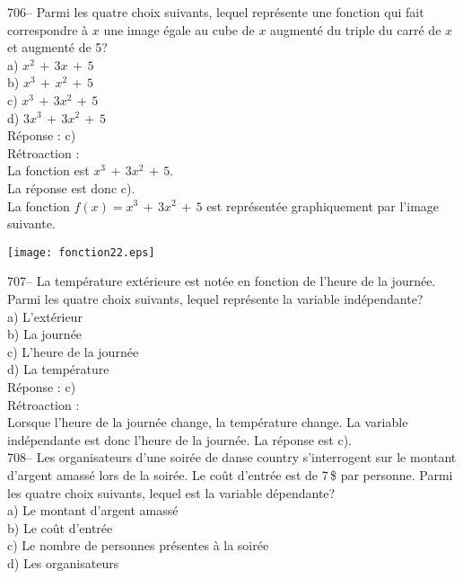 ﻿\documentclass[letterpaper, 12pt]{article}
\begin{document}
706-- Parmi les quatre choix suivants, lequel repr\'esente une fonction qui
fait correspondre \`a $x$ une image \'egale au cube de $x$ augment\'e du
triple du carr\'e de $x$ et augment\'e de 5?\\
a) $x^{2}\,+\,3x \,+\,5$\\
b) $x^{3}\,+\,x^{2}\,+\,5$\\
c) $x^{3}\,+\,3x^{2}\,+\,5$\\
d) $3x^{3}\,+\,3x^{2}\,+\,5$\\

R\'eponse : c)\\

R\'etroaction : \\
La fonction est $x^{3}\,+\,3x^{2}\,+\,5$.\\
La r\'eponse est donc c).\\
La fonction $f(x)=x^{3}\,+\,3x^{2}\,+\,5$ est repr\'esent\'ee graphiquement
par l'image suivante.  \\
    \begin{center}
    \texttt{[image: fonction22.eps]}
    \end{center}


707-- La temp\'erature ext\'erieure est not\'ee en fonction de l'heure de la
journ\'ee.  Parmi les quatre choix suivants, lequel repr\'esente la variable
ind\'ependante?\\
a) L'ext\'erieur\\
b) La journ\'ee\\
c) L'heure de la journ\'ee\\
d) La temp\'erature\\

R\'eponse :  c)\\

R\'etroaction : \\
Lorsque l'heure de la journ\'ee change, la temp\'erature change.  La
variable ind\'ependante est donc l'heure de la journ\'ee.  La r\'eponse est
c).\\

708-- Les organisateurs d'une soir\'ee de danse country s'interrogent sur le
montant d'argent amass\'e lors de la soir\'ee.  Le co\^ut d'entr\'ee est de
7\,\$ par personne.  Parmi les quatre choix suivants, lequel est la variable
d\'ependante?\\
a) Le montant d'argent amass\'e\\
b) Le co\^ut d'entr\'ee\\
c) Le nombre de personnes pr\'esentes \`a la soir\'ee\\
d) Les organisateurs\\
\end{document}
